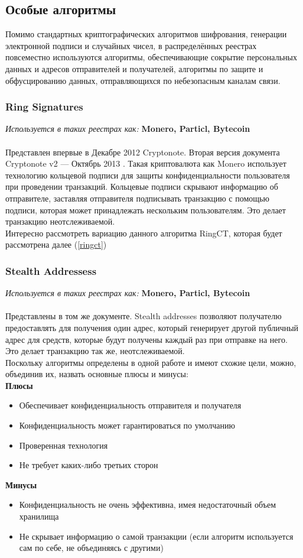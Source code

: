 \newpage
\subsection{Особые алгоритмы}
Помимо стандартных криптографических алгоритмов шифрования, генерации
электронной подписи и случайных чисел, в распределённых реестрах повсеместно
используются алгоритмы, обеспечивающие сокрытие персональных данных и адресов
отправителей и получателей, алгоритмы по защите и обфусцированию данных,
отправляющихся по небезопасным каналам связи.
\subsubsection{Ring Signatures}
\emph{Используется в таких реестрах как: } \textbf{Monero, Particl, Bytecoin} \\\\
Представлен впервые в Декабре 2012 \cite{VanSaberhagen2012} Cryptonote. Вторая версия документа
Cryptonote v2 --- Октябрь 2013 \cite{VanSaberhagen2013}.
Такая криптовалюта как Monero использует технологию кольцевой
подписи для защиты конфиденциальности пользователя при проведении транзакций.
Кольцевые подписи скрывают информацию об отправителе, заставляя отправителя
подписывать транзакцию с помощью подписи, которая может принадлежать нескольким
пользователям. Это делает транзакцию неотслеживаемой.\\
Интересно рассмотреть вариацию данного алгоритма RingCT, которая будет
рассмотрена далее (\ref{ringct})
\subsubsection{Stealth Addressess}
\emph{Используется в таких реестрах как: } \textbf{Monero, Particl, Bytecoin} \\\\
Представлены в том же документе. Stealth addresses позволяют получателю
предоставлять для получения один адрес, который генерирует другой публичный
адрес для средств, которые будут получены каждый раз при отправке на него. Это
делает транзакцию так же, неотслеживаемой.\\

Поскольку алгоритмы определены в одной работе и имеют схожие цели, можно,
объединив их, назвать основные плюсы и минусы:\\
\textbf{Плюсы}
\begin{itemize}
    \item Обеспечивает конфиденциальность отправителя и получателя
    \item Конфиденциальность может гарантироваться по умолчанию
    \item Проверенная технология
    \item Не требует каких-либо третьих сторон
\end{itemize}
\textbf{Минусы}
\begin{itemize}
    \item Конфиденциальность не очень эффективна, имея недостаточный объем
          хранилища
    \item Не скрывает информацию о самой транзакции (если алгоритм
          используется сам по себе, не объединяясь с другими)
\end{itemize}

